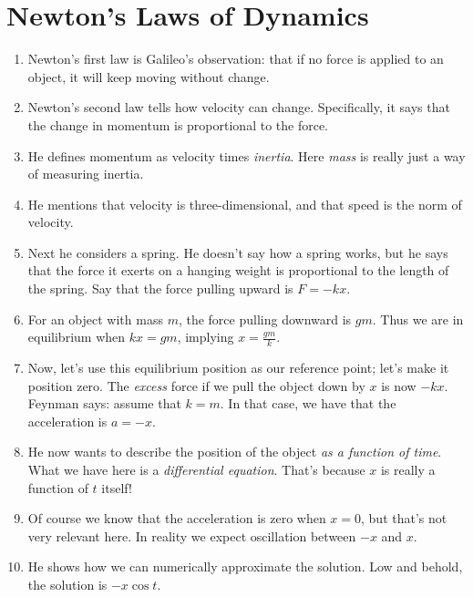 \section{Newton's Laws of Dynamics}

\begin{enumerate}

  \item Newton's first law is Galileo's observation: that if no force is
  applied to an object, it will keep moving without change.

  \item Newton's second law tells how velocity can change. Specifically,
  it says that the change in momentum is proportional to the force.

  \item He defines momentum as velocity times \emph{inertia}. Here
  \emph{mass} is really just a way of measuring inertia.

  \item He mentions that velocity is three-dimensional, and that speed
  is the norm of velocity.

  \item Next he considers a spring. He doesn't say how a spring works,
  but he says that the force it exerts on a hanging weight is
  proportional to the length of the spring. Say that the force pulling
  upward is $F = -kx$.

  \item For an object with mass $m$, the force pulling downward is $gm$.
  Thus we are in equilibrium when $kx = gm$, implying $x =
  \frac{gm}{k}$.

  \item Now, let's use this equilibrium position as our reference point;
  let's make it position zero. The \emph{excess} force if we pull the
  object down by $x$ is now $-kx$. Feynman says: assume that $k = m$. In
  that case, we have that the acceleration is $a = -x$.

  \item He now wants to describe the position of the object \emph{as a
  function of time}. What we have here is a \emph{differential
  equation}. That's because $x$ is really a function of $t$ itself!

  \item Of course we know that the acceleration is zero when $x = 0$,
  but that's not very relevant here. In reality we expect oscillation
  between $-x$ and $x$.

  \item He shows how we can numerically approximate the solution. Low
  and behold, the solution is $-x \cos t$.


\end{enumerate}
